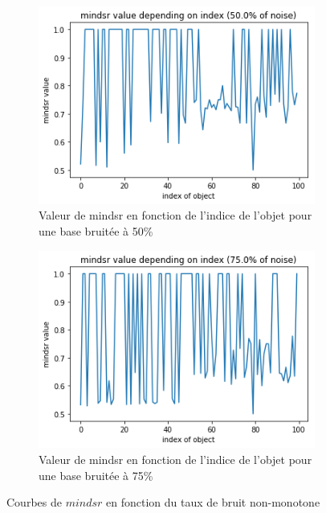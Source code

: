 \documentclass[a4paper]{article}
\begin{document}
\begin{figure}[H]
    \begin{subfigure}[c]{0.46\textwidth}
	    \centering 
	    \includegraphics[width=\textwidth]{images/mindsr_50.png}
        \caption{Valeur de mindsr en fonction de l'indice de l'objet pour une base
        bruitée à 50\%}
        \label{img:mindsr50}
    \end{subfigure}
    \begin{subfigure}[c]{0.46\textwidth}
    	\centering
    	\includegraphics[width=\textwidth]{images/mindsr_75.png}
        \caption{Valeur de mindsr en fonction de l'indice de l'objet pour une base
        bruitée à 75\%}
        \label{img:mindsr75}
    \end{subfigure}
\caption{Courbes de $mindsr$ en fonction du taux de bruit non-monotone}
\end{figure}
\end{document}
